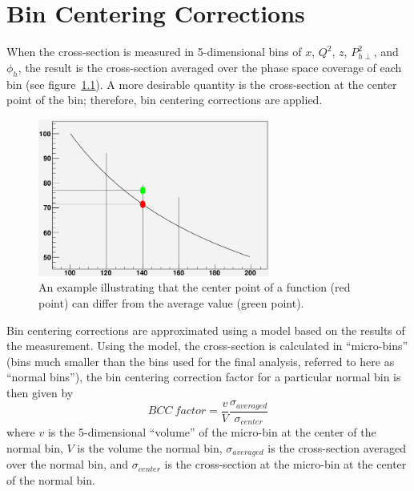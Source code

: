 \chapter{Bin Centering Corrections}
\label{cha:BCC}
%
When the cross-section is measured in 5-dimensional bins of $x$, $Q^2$, $z$, $P_{h\perp}^2$, and $\phi_h$, the result is the cross-section averaged over the phase space coverage of each bin (see figure~\ref{fig:BCC_basicExample}).
A more desirable quantity is the cross-section at the center point of the bin; therefore, bin centering corrections are applied.
%
\begin{figure}[htp]
\centering
\includegraphics[width=3in]{figures/BCC_basicExample.png}
\caption{An example illustrating that the center point of a function (red point) can differ from the average value (green point).}
\label{fig:BCC_basicExample}
\end{figure}

Bin centering corrections are approximated using a model based on the results of the measurement.
Using the model, the cross-section is calculated in ``micro-bins'' (bins much smaller than the bins used for the final analysis, referred to here as ``normal bins''), the bin centering correction factor for a particular normal bin is then given by
\begin{equation}
\label{eq:BCCequation}
BCC\ factor = \frac{v}{V} \frac{\sigma_{averaged}}{\sigma_{center}}
\end{equation}
where $v$ is the 5-dimensional ``volume'' of the micro-bin at the center of the normal bin, $V$ is the volume the normal bin, $\sigma_{averaged}$ is the cross-section averaged over the normal bin, and $\sigma_{center}$ is the cross-section at the micro-bin at the center of the normal bin.

\clearpage
